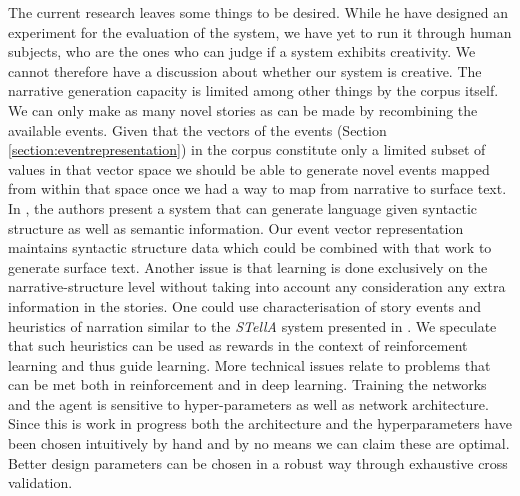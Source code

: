 \documentclass[11pt,letterpaper]{article}
\begin{document}
The current research leaves some things to be desired. While he have designed an experiment for the evaluation of the system, we have yet to run it through human subjects, who are the ones who can judge if a system exhibits creativity. We cannot therefore have a discussion about whether our system is creative. The narrative generation capacity is limited among other things by the corpus itself. We can only make as many novel stories as can be made by recombining the available events. Given that the vectors of the events (Section \ref{section:eventrepresentation}) in the corpus constitute only a limited subset of values in that vector space we should be able to generate novel events mapped from within that space once we had a way to map from narrative to surface text. In \cite{kobayashi2016human}, the authors present a system that can generate language given syntactic structure as well as semantic information. Our event vector representation maintains syntactic structure data which could be combined with that work to generate surface text. Another issue is that learning is done exclusively on the narrative-structure level without taking into account any consideration any extra information in the stories. One could use characterisation of story events and heuristics of narration similar to the \emph{STellA} system presented in \cite{leon2014creativity}. We speculate that such heuristics can be used as rewards in the context of reinforcement learning and thus guide learning. More technical issues relate to problems that can be met both in reinforcement and in deep learning. Training the networks and the agent is sensitive to hyper-parameters as well as network architecture. Since this is work in progress both the architecture and the hyperparameters have been chosen intuitively by hand and by no means we can claim these are optimal. Better design parameters can be chosen in a robust way through exhaustive cross validation.




\end{document}
